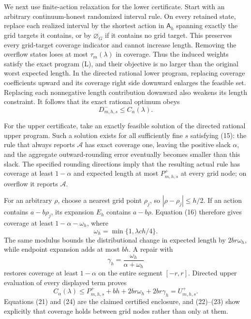 We next use finite-action relaxation for the lower certificate.  Start
with an arbitrary continuum-honest randomized interval rule.  On every
retained state, replace each realized interval by the shortest action in
\(\mathsf A_h\) spanning exactly the grid targets it contains, or by
\(\varnothing_G\) if it contains no grid target.  This preserves every
grid-target coverage indicator and cannot increase length.  Removing the
overflow states loses at most \(\tau_m(\lambda)\) in coverage.  Thus the
induced weights satisfy the exact program (L), and their objective is no
larger than the original worst expected length.  In the directed rational
lower program, replacing coverage coefficients upward and its coverage
right side downward enlarges the feasible set.  Replacing each
nonnegative length contribution downward also weakens its length
constraint.  It follows that its exact rational optimum obeys
\[
 D_{m,h,s}^-\leq C_\alpha(\lambda).
 \tag{21}
\]

For the upper certificate, take an exactly feasible solution of the
directed rational upper program.  Such a solution exists for all
sufficiently fine \(s\) satisfying (15): the rule that always reports
\(\mathcal A\) has exact coverage one, leaving the positive slack
\(\alpha\), and the aggregate outward-rounding error eventually becomes
smaller than this slack.  The specified rounding directions imply that
the resulting actual rule has coverage at least \(1-\alpha\) and expected
length at most \(P_{m,h,s}^+\) at every grid node; on overflow it reports
\(\mathcal A\).

For an arbitrary \(\rho\), choose a nearest grid point \(\rho_j\), so
\(|\rho-\rho_j|\leq h/2\).  If an action contains
\(a-b\rho_j\), its expansion \(E_h\) contains \(a-b\rho\).  Equation
(16) therefore gives coverage at least \(1-\alpha-\omega_h\), where
\[
 \omega_h=\min\{1,\lambda ch/4\}.
 \tag{22}
\]
The same modulus bounds the distributional change in expected length by
\(2br\omega_h\), while endpoint expansion adds at most \(bh\).  A repair
with
\[
 \gamma_h=\frac{\omega_h}{\alpha+\omega_h}
 \tag{23}
\]
restores coverage at least \(1-\alpha\) on the entire segment
\([-r,r]\).  Directed upper evaluation of every displayed term proves
\[
 C_\alpha(\lambda)
 \leq P_{m,h,s}^++bh+2br\omega_h+2br\gamma_h
 =U_{m,h,s}^+.
 \tag{24}
\]
Equations (21) and (24) are the claimed certified enclosure, and (22)--(23)
show explicitly that coverage holds between grid nodes rather than only
at them.

